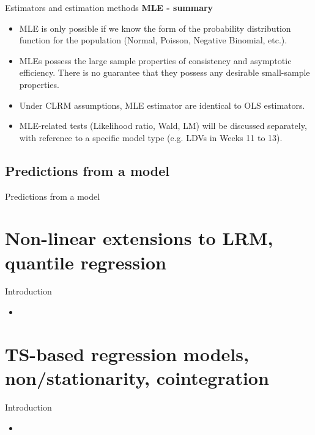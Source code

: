 \documentclass{beamer}
\begin{document}
\begin{frame}{Estimators and estimation methods}
\textbf{MLE - summary}\\
\begin{itemize}
\item MLE is only possible if we know the form of the probability distribution function for the population (Normal, Poisson, Negative Binomial, etc.).
\medskip
\item MLEs possess the large sample properties of consistency and asymptotic efficiency. There is no guarantee that they possess any desirable small-sample properties. 
\medskip
\item Under CLRM assumptions, MLE estimator are identical to OLS estimators.
\medskip
\item MLE-related tests (Likelihood ratio, Wald, LM) will be discussed separately, with reference to a specific model type (e.g. LDVs in Weeks 11 to 13).
\end{itemize}
\end{frame}
\subsection{Predictions from a model}
\begin{frame}{Predictions from a model}
    
\end{frame}
\section{Non-linear extensions to LRM, quantile regression}

\begin{frame}{Introduction}

\begin{itemize}
  \item 
\end{itemize}

\end{frame}
\section{TS-based regression models, non/stationarity, cointegration}

\begin{frame}{Introduction}

\begin{itemize}
  \item 
\end{itemize}

\end{frame}
\end{document}
